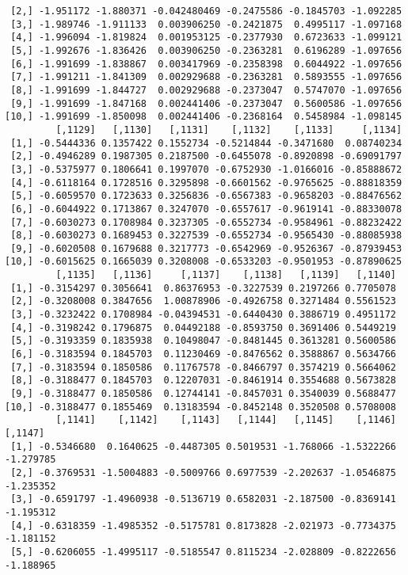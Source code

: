 \documentclass[
  letterpaper,
  DIV=11,
  numbers=noendperiod]{scrreprt}
\begin{document}
\begin{verbatim}
 [2,] -1.951172 -1.880371 -0.042480469 -0.2475586 -0.1845703 -1.092285
 [3,] -1.989746 -1.911133  0.003906250 -0.2421875  0.4995117 -1.097168
 [4,] -1.996094 -1.819824  0.001953125 -0.2377930  0.6723633 -1.099121
 [5,] -1.992676 -1.836426  0.003906250 -0.2363281  0.6196289 -1.097656
 [6,] -1.991699 -1.838867  0.003417969 -0.2358398  0.6044922 -1.097656
 [7,] -1.991211 -1.841309  0.002929688 -0.2363281  0.5893555 -1.097656
 [8,] -1.991699 -1.844727  0.002929688 -0.2373047  0.5747070 -1.097656
 [9,] -1.991699 -1.847168  0.002441406 -0.2373047  0.5600586 -1.097656
[10,] -1.991699 -1.850098  0.002441406 -0.2368164  0.5458984 -1.098145
         [,1129]   [,1130]   [,1131]    [,1132]    [,1133]     [,1134]
 [1,] -0.5444336 0.1357422 0.1552734 -0.5214844 -0.3471680  0.08740234
 [2,] -0.4946289 0.1987305 0.2187500 -0.6455078 -0.8920898 -0.69091797
 [3,] -0.5375977 0.1806641 0.1997070 -0.6752930 -1.0166016 -0.85888672
 [4,] -0.6118164 0.1728516 0.3295898 -0.6601562 -0.9765625 -0.88818359
 [5,] -0.6059570 0.1723633 0.3256836 -0.6567383 -0.9658203 -0.88476562
 [6,] -0.6044922 0.1713867 0.3247070 -0.6557617 -0.9619141 -0.88330078
 [7,] -0.6030273 0.1708984 0.3237305 -0.6552734 -0.9584961 -0.88232422
 [8,] -0.6030273 0.1689453 0.3227539 -0.6552734 -0.9565430 -0.88085938
 [9,] -0.6020508 0.1679688 0.3217773 -0.6542969 -0.9526367 -0.87939453
[10,] -0.6015625 0.1665039 0.3208008 -0.6533203 -0.9501953 -0.87890625
         [,1135]   [,1136]     [,1137]    [,1138]   [,1139]   [,1140]
 [1,] -0.3154297 0.3056641  0.86376953 -0.3227539 0.2197266 0.7705078
 [2,] -0.3208008 0.3847656  1.00878906 -0.4926758 0.3271484 0.5561523
 [3,] -0.3232422 0.1708984 -0.04394531 -0.6440430 0.3886719 0.4951172
 [4,] -0.3198242 0.1796875  0.04492188 -0.8593750 0.3691406 0.5449219
 [5,] -0.3193359 0.1835938  0.10498047 -0.8481445 0.3613281 0.5600586
 [6,] -0.3183594 0.1845703  0.11230469 -0.8476562 0.3588867 0.5634766
 [7,] -0.3183594 0.1850586  0.11767578 -0.8466797 0.3574219 0.5664062
 [8,] -0.3188477 0.1845703  0.12207031 -0.8461914 0.3554688 0.5673828
 [9,] -0.3188477 0.1850586  0.12744141 -0.8457031 0.3540039 0.5688477
[10,] -0.3188477 0.1855469  0.13183594 -0.8452148 0.3520508 0.5708008
         [,1141]    [,1142]    [,1143]   [,1144]   [,1145]    [,1146]   [,1147]
 [1,] -0.5346680  0.1640625 -0.4487305 0.5019531 -1.768066 -1.5322266 -1.279785
 [2,] -0.3769531 -1.5004883 -0.5009766 0.6977539 -2.202637 -1.0546875 -1.235352
 [3,] -0.6591797 -1.4960938 -0.5136719 0.6582031 -2.187500 -0.8369141 -1.195312
 [4,] -0.6318359 -1.4985352 -0.5175781 0.8173828 -2.021973 -0.7734375 -1.181152
 [5,] -0.6206055 -1.4995117 -0.5185547 0.8115234 -2.028809 -0.8222656 -1.188965

\end{verbatim}
\end{document}
